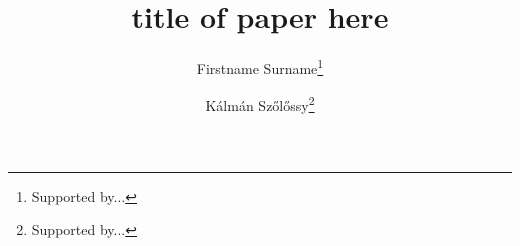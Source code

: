 


\begin{frontmatter}%


\title{title of paper here}  %







\author[surname]{Firstname Surname\thanks{Supported by...}}
\author[szolossy]{K\'alm\'an Sz\H{o}l\H{o}ssy\thanks{Supported by...}}


\end{frontmatter}
